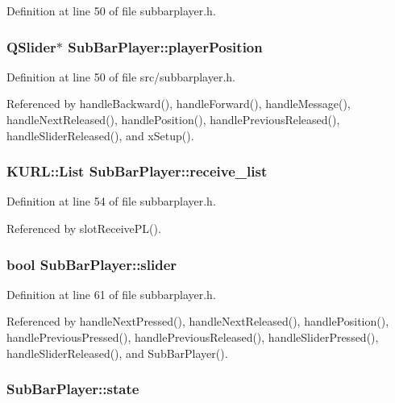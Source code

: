 Definition at line 50 of file subbarplayer.h.
\subsubsection{\setlength{\rightskip}{0pt plus 5cm}QSlider$\ast$ {\bf Sub\-Bar\-Player::player\-Position}}\label{classSubBarPlayer_SubBarPlayero1}




Definition at line 50 of file src/subbarplayer.h.

Referenced by handle\-Backward(), handle\-Forward(), handle\-Message(), handle\-Next\-Released(), handle\-Position(), handle\-Previous\-Released(), handle\-Slider\-Released(), and x\-Setup().
\subsubsection{\setlength{\rightskip}{0pt plus 5cm}KURL::List {\bf Sub\-Bar\-Player::receive\_\-list}}\label{classSubBarPlayer_SubBarPlayero5}




Definition at line 54 of file subbarplayer.h.

Referenced by slot\-Receive\-PL().
\subsubsection{\setlength{\rightskip}{0pt plus 5cm}bool {\bf Sub\-Bar\-Player::slider}\hspace{0.3cm}{\tt  [private]}}\label{classSubBarPlayer_SubBarPlayerr3}




Definition at line 61 of file subbarplayer.h.

Referenced by handle\-Next\-Pressed(), handle\-Next\-Released(), handle\-Position(), handle\-Previous\-Pressed(), handle\-Previous\-Released(), handle\-Slider\-Pressed(), handle\-Slider\-Released(), and Sub\-Bar\-Player().
\subsubsection{ {\bf Sub\-Bar\-Player::state}\hspace{0.3cm}{\tt  [private]}}\label{classSubBarPlayer_SubBarPlayerr2}





